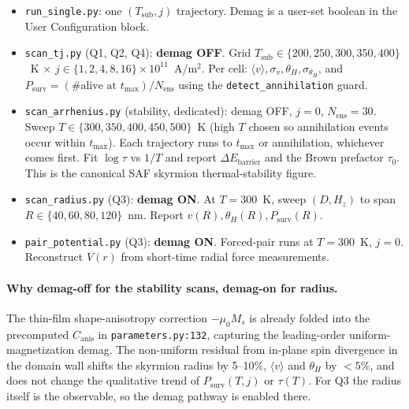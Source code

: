 \documentclass[11pt,a4paper]{article}
\newcommand{\Ms}{M_s}
\newcommand{\jcur}{j}
\begin{document}
\begin{itemize}[leftmargin=2em]
    \item \texttt{run\_single.py}: one $(T_{\text{sub}}, \jcur)$
    trajectory. Demag is a user-set boolean in the User
    Configuration block.

    \item \texttt{scan\_tj.py} (Q1, Q2, Q4): \textbf{demag OFF}.
    Grid $T_{\text{sub}} \in \{200, 250, 300, 350, 400\}$~K $\times$
    $\jcur \in \{1, 2, 4, 8, 16\} \times 10^{11}$~A/m$^2$. Per cell:
    $\langle v\rangle, \sigma_v, \theta_H, \sigma_{\theta_H}$, and
    $P_{\text{surv}} = (\#\text{alive at }t_{\max})/N_{\text{ens}}$
    using the \texttt{detect\_annihilation} guard.

    \item \texttt{scan\_arrhenius.py} (stability, dedicated): demag
    OFF, $\jcur = 0$, $N_{\text{ens}} = 30$. Sweep $T \in \{300,
    350, 400, 450, 500\}$~K (high $T$ chosen so annihilation events
    occur within $t_{\max}$). Each trajectory runs to $t_{\max}$ or
    annihilation, whichever comes first. Fit $\log \tau$ vs $1/T$
    and report $\Delta E_{\text{barrier}}$ and the Brown prefactor
    $\tau_0$. This is the canonical SAF skyrmion thermal-stability
    figure.

    \item \texttt{scan\_radius.py} (Q3): \textbf{demag ON}. At
    $T = 300$~K, sweep $(D, H_z)$ to span
    $R \in \{40, 60, 80, 120\}$~nm. Report $v(R), \theta_H(R),
    P_{\text{surv}}(R)$.

    \item \texttt{pair\_potential.py} (Q3): \textbf{demag ON}.
    Forced-pair runs at $T = 300$~K, $\jcur = 0$. Reconstruct
    $V(r)$ from short-time radial force measurements.
\end{itemize}

\paragraph{Why demag-off for the stability scans, demag-on for
radius.} The thin-film shape-anisotropy correction $-\mu_0 \Ms$ is
already folded into the precomputed $C_{\text{anis}}$ in
\texttt{parameters.py:132}, capturing the leading-order
uniform-magnetization demag. The non-uniform residual from
in-plane spin divergence in the domain wall shifts the skyrmion
radius by 5--10\%, $\langle v \rangle$ and $\theta_H$ by $<5\%$,
and does not change the qualitative trend of $P_{\text{surv}}(T,
\jcur)$ or $\tau(T)$. For Q3 the radius itself is the observable,
so the demag pathway is enabled there.
\end{document}
